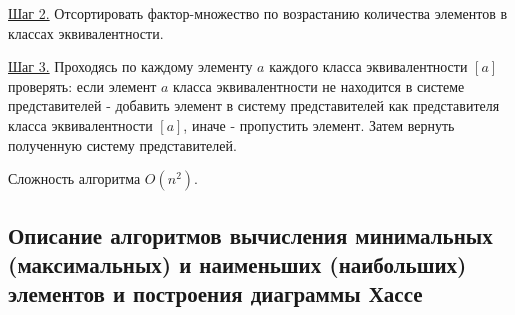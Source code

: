 \documentclass[spec, och, labwork]{shiza}
\begin{document}
\begin{enumerate}
                \underline{Шаг 2.} Отсортировать фактор-множество по возрастанию количества элементов в классах эквивалентности.

                \underline{Шаг 3.} Проходясь по каждому элементу $a$ каждого класса эквивалентности $[a]$ проверять: если элемент $a$ 
                класса эквивалентности не находится в системе представителей - добавить элемент в систему представителей как представителя 
                класса эквивалентности $[a]$, иначе - пропустить элемент. Затем вернуть полученную систему представителей.
            
                Сложность алгоритма $O(n^2)$.

            \end{enumerate}

\subsection{Описание  алгоритмов  вычисления  минимальных  (максимальных)  и  наименьших (наибольших) элементов и построения диаграммы Хассе}
\end{document}
